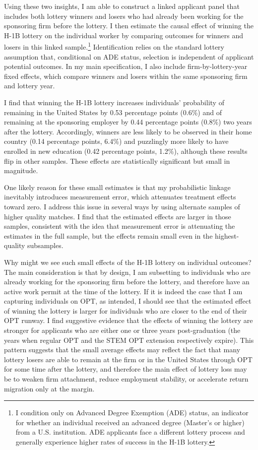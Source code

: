 Using these two insights, I am able to construct a linked applicant panel that includes both lottery winners and losers who had already been working for the sponsoring firm before the lottery. I then estimate the causal effect of winning the H-1B lottery on the individual worker by comparing outcomes for winners and losers in this linked sample.\footnote{I condition only on Advanced Degree Exemption (ADE) status, an indicator for whether an individual received an advanced degree (Master's or higher) from a U.S. institution. ADE applicants face a different lottery process and generally experience higher rates of success in the H-1B lottery.} Identification relies on the standard lottery assumption that, conditional on ADE status, selection is independent of applicant potential outcomes. In my main specification, I also include firm-by-lottery-year fixed effects, which compare winners and losers within the same sponsoring firm and lottery year.

I find that winning the H-1B lottery increases individuals' probability of remaining in the United States by 0.53 percentage points (0.6\%\sym{***}) and of remaining at the sponsoring employer by 0.44 percentage points (0.8\%\sym{**}) two years after the lottery. Accordingly, winners are less likely to be observed in their home country (0.14 percentage points, 6.4\%\sym{*}) and puzzlingly more likely to have enrolled in new education (0.42 percentage points, 1.2\%\sym{*}), although these results flip in other samples. These effects are statistically significant but small in magnitude.

One likely reason for these small estimates is that my  probabilistic linkage inevitably introduces measurement error, which attenuates treatment effects toward zero. I address this issue in several ways by using alternate samples of higher quality matches. I find that the estimated effects are larger in those samples, consistent with the idea that measurement error is attenuating the estimates in the full sample, but the effects remain small even in the highest-quality subsamples.

Why might we see such small effects of the H-1B lottery on individual outcomes? The main consideration is that by design, I am subsetting to individuals who are already working for the sponsoring firm before the lottery, and therefore have an active work permit at the time of the lottery. If it is indeed the case that I am capturing individuals on OPT, as intended, I should see that the estimated effect of winning the lottery is larger for individuals who are closer to the end of their OPT runway. I find suggestive evidence that the effects of winning the lottery are stronger for applicants who are either one or three years post-graduation (the years when regular OPT and the STEM OPT extension respectively expire). This pattern suggests that the small average effects may reflect the fact that many lottery losers are able to remain at the firm or in the United States through OPT for some time after the lottery, and therefore the main effect of lottery loss may be to weaken firm attachment, reduce employment stability, or accelerate return migration only at the margin.

